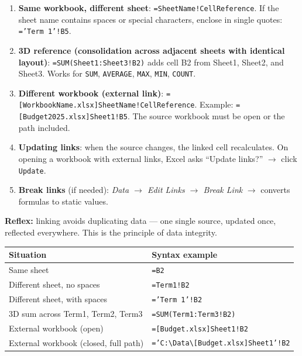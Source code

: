 \documentclass[11pt]{article}
\newcommand{\cle}[1]{{\popxbold\color{popdark}#1}}
\begin{document}
\begin{methode}
\begin{enumerate}
\item \textbf{Same workbook, different sheet}: \texttt{=SheetName!CellReference}. If the sheet name contains spaces or special characters, enclose in single quotes: \texttt{='Term 1'!B5}.
\item \textbf{3D reference (consolidation across adjacent sheets with identical layout)}: \texttt{=SUM(Sheet1:Sheet3!B2)} adds cell B2 from Sheet1, Sheet2, and Sheet3. Works for \texttt{SUM}, \texttt{AVERAGE}, \texttt{MAX}, \texttt{MIN}, \texttt{COUNT}.
\item \textbf{Different workbook (external link)}: \texttt{=[WorkbookName.xlsx]SheetName!CellReference}. Example: \texttt{=[Budget2025.xlsx]Sheet1!B5}. The source workbook must be open or the path included.
\item \textbf{Updating links}: when the source changes, the linked cell recalculates. On opening a workbook with external links, Excel asks ``Update links?'' $\rightarrow$ click \texttt{Update}.
\item \textbf{Break links} (if needed): \emph{Data $\rightarrow$ Edit Links $\rightarrow$ Break Link} $\rightarrow$ converts formulas to static values.
\end{enumerate}
\textbf{Reflex:} linking avoids duplicating data --- one single source, updated once, reflected everywhere. This is the principle of \cle{data integrity}.
\end{methode}

\begin{aretenir}
\begin{center}
\begin{tabular}{|l|l|}\hline
\textbf{Situation} & \textbf{Syntax example} \\ \hline
Same sheet & \texttt{=B2} \\ \hline
Different sheet, no spaces & \texttt{=Term1!B2} \\ \hline
Different sheet, with spaces & \texttt{='Term 1'!B2} \\ \hline
3D sum across Term1, Term2, Term3 & \texttt{=SUM(Term1:Term3!B2)} \\ \hline
External workbook (open) & \texttt{=[Budget.xlsx]Sheet1!B2} \\ \hline
External workbook (closed, full path) & \texttt{='C:\textbackslash{}Data\textbackslash{}[Budget.xlsx]Sheet1'!B2} \\ \hline
\end{tabular}
\end{center}
\end{aretenir}
\end{document}
